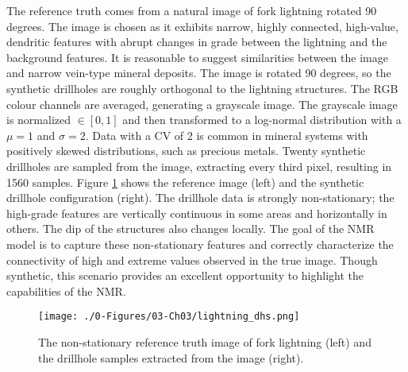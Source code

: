 The reference truth comes from a natural image of fork lightning rotated 90 degrees. The image is chosen as it exhibits narrow, highly connected, high-value, dendritic features with abrupt changes in grade between the lightning and the background features. It is reasonable to suggest similarities between the image and narrow vein-type mineral deposits. The image is rotated 90 degrees, so the synthetic drillholes are roughly orthogonal to the lightning structures. The \gls{RGB} colour channels are averaged, generating a grayscale image. The grayscale image is normalized $\in [0, 1]$ and then transformed to a log-normal distribution with a $\mu = 1$ and $\sigma = 2$. Data with a \gls{CV} of 2 is common in mineral systems with positively skewed distributions, such as precious metals. Twenty synthetic drillholes are sampled from the image, extracting every third pixel, resulting in 1560 samples. Figure \ref{fig:lightning_dhs} shows the reference image (left) and the synthetic drillhole configuration (right). The drillhole data is strongly non-stationary; the high-grade features are vertically continuous in some areas and horizontally in others. The dip of the structures also changes locally. The goal of the \gls{NMR} model is to capture these non-stationary features and correctly characterize the connectivity of high and extreme values observed in the true image. Though synthetic, this scenario provides an excellent opportunity to highlight the capabilities of the \gls{NMR}.

\begin{figure}[htb!]
    \centering
    \texttt{[image: ./0-Figures/03-Ch03/lightning\_dhs.png]}
    \caption{The non-stationary reference truth image of fork lightning (left) and the drillhole samples extracted from the image (right). }
    \label{fig:lightning_dhs}
\end{figure}

